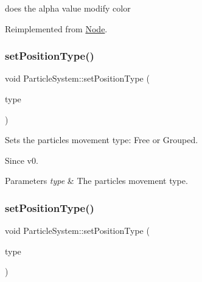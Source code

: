does the alpha value modify color 

Reimplemented from \hyperlink{classNode_a978c5435ab23f76e9efdf0f7e9e288e5}{Node}.

\mbox{\label{classParticleSystem_a4603eb21cf9e05c94d24d39cb5d21284}} 
\subsubsection{\texorpdfstring{set\+Position\+Type()}{setPositionType()}\hspace{0.1cm}{\footnotesize\ttfamily [1/2]}}
{\footnotesize\ttfamily void Particle\+System\+::set\+Position\+Type (\begin{DoxyParamCaption}\item[{\hyperlink{classParticleSystem_a9856f9eca1df7c6f2a2e54a1549cff27}{Position\+Type}}]{type }\end{DoxyParamCaption})\hspace{0.3cm}{\ttfamily [inline]}}

Sets the particles movement type\+: Free or Grouped. \begin{DoxySince}{Since}
v0.
\end{DoxySince}

\begin{DoxyParams}{Parameters}
{\em type} & The particles movement type. \\
\hline
\end{DoxyParams}
\mbox{\label{classParticleSystem_a4603eb21cf9e05c94d24d39cb5d21284}} 
\subsubsection{\texorpdfstring{set\+Position\+Type()}{setPositionType()}\hspace{0.1cm}{\footnotesize\ttfamily [2/2]}}
{\footnotesize\ttfamily void Particle\+System\+::set\+Position\+Type (\begin{DoxyParamCaption}\item[{\hyperlink{classParticleSystem_a9856f9eca1df7c6f2a2e54a1549cff27}{Position\+Type}}]{type }\end{DoxyParamCaption})\hspace{0.3cm}{\ttfamily [inline]}}

